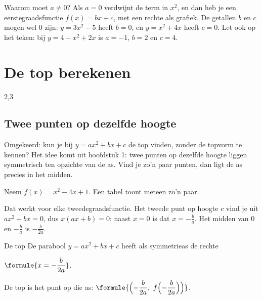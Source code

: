 Waarom moet $a \neq 0$? Als $a = 0$ verdwijnt de term in $x^2$, en dan heb je een eerstegraadsfunctie $f(x) = bx + c$, met een rechte als grafiek. De getallen $b$ en $c$ mogen wel $0$ zijn: $y = 3x^2 - 5$ heeft $b = 0$, en $y = x^2 + 4x$ heeft $c = 0$. Let ook op het teken: bij $y = 4 - x^2 + 2x$ is $a = -1$, $b = 2$ en $c = 4$.

\begin{oefeningen}
\end{oefeningen}

\section{De top berekenen}

\begin{alleenvoor}{2,3}
\subsection{Twee punten op dezelfde hoogte}

Omgekeerd: kun je bij $y = ax^2 + bx + c$ de top vinden, zonder de topvorm te kennen? Het idee komt uit hoofdstuk 1: twee punten op dezelfde hoogte liggen symmetrisch ten opzichte van de as. Vind je zo'n paar punten, dan ligt de as precies in het midden.

Neem $f(x) = x^2 - 4x + 1$. Een tabel toont meteen zo'n paar.


Dat werkt voor elke tweedegraadsfunctie. Het tweede punt op hoogte $c$ vind je uit $ax^2 + bx = 0$, dus $x(ax + b) = 0$: naast $x = 0$ is dat $x = -\tfrac ba$. Het midden van $0$ en $-\tfrac ba$ is $-\tfrac{b}{2a}$.

\begin{theorie}
\begin{stelling}{De top}
De parabool $y = ax^2 + bx + c$ heeft als symmetrieas de rechte

\qquad $\formule{x = -\dfrac{b}{2a}}$.


De top is het punt op die as: $\formule{\Bigl(-\dfrac{b}{2a},\ f\Bigl(-\dfrac{b}{2a}\Bigr)\Bigr)}$.
\end{stelling}
\end{theorie}
\end{alleenvoor}

